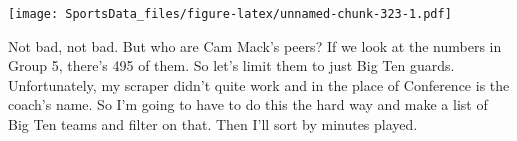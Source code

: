 \documentclass[
]{book}
\newenvironment{Shaded}{\begin{snugshade}}{\end{snugshade}}
\newcommand{\DecValTok}[1]{\textcolor[rgb]{0.00,0.00,0.81}{#1}}
\newcommand{\KeywordTok}[1]{\textcolor[rgb]{0.13,0.29,0.53}{\textbf{#1}}}
\newcommand{\NormalTok}[1]{#1}
\newcommand{\OperatorTok}[1]{\textcolor[rgb]{0.81,0.36,0.00}{\textbf{#1}}}
\newcommand{\StringTok}[1]{\textcolor[rgb]{0.31,0.60,0.02}{#1}}
\begin{document}
\texttt{[image: SportsData\_files/figure-latex/unnamed-chunk-323-1.pdf]}

Not bad, not bad. But who are Cam Mack's peers? If we look at the numbers in Group 5, there's 495 of them. So let's limit them to just Big Ten guards. Unfortunately, my scraper didn't quite work and in the place of Conference is the coach's name. So I'm going to have to do this the hard way and make a list of Big Ten teams and filter on that. Then I'll sort by minutes played.

\begin{Shaded}
\end{Shaded}
\end{document}
